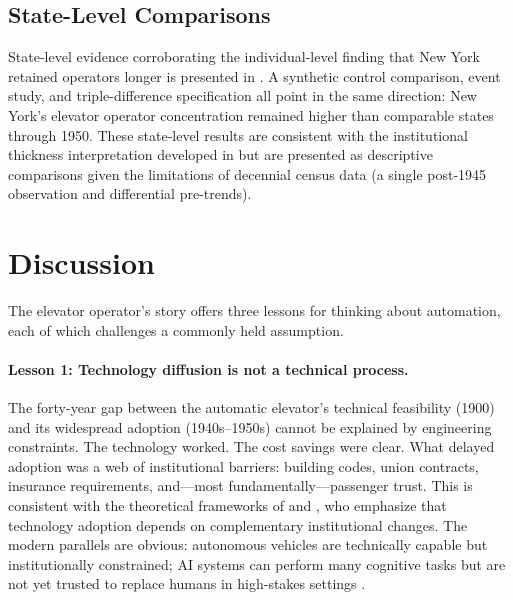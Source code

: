 \documentclass[12pt]{article}
\begin{document}
\subsection{State-Level Comparisons}

State-level evidence corroborating the individual-level finding that New York retained operators longer is presented in . A synthetic control comparison, event study, and triple-difference specification all point in the same direction: New York's elevator operator concentration remained higher than comparable states through 1950. These state-level results are consistent with the institutional thickness interpretation developed in  but are presented as descriptive comparisons given the limitations of decennial census data (a single post-1945 observation and differential pre-trends).



\section{Discussion} \label{sec:discussion}

The elevator operator's story offers three lessons for thinking about automation, each of which challenges a commonly held assumption.

\paragraph{Lesson 1: Technology diffusion is not a technical process.} The forty-year gap between the automatic elevator's technical feasibility (1900) and its widespread adoption (1940s--1950s) cannot be explained by engineering constraints. The technology worked. The cost savings were clear. What delayed adoption was a web of institutional barriers: building codes, union contracts, insurance requirements, and---most fundamentally---passenger trust. This is consistent with the theoretical frameworks of \citet{david1990} and \citet{comin2010}, who emphasize that technology adoption depends on complementary institutional changes. The modern parallels are obvious: autonomous vehicles are technically capable but institutionally constrained; AI systems can perform many cognitive tasks but are not yet trusted to replace humans in high-stakes settings \citep{brynjolfsson2017, noy2023}.
\end{document}
